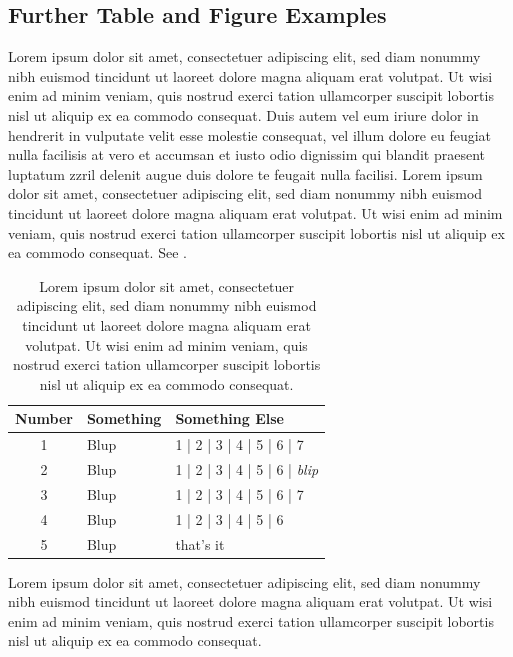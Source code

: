 \subsection{Further Table and Figure Examples}
\label{sec:impr_wd}
Lorem ipsum dolor sit amet, consectetuer adipiscing elit, sed diam nonummy nibh euismod tincidunt ut laoreet dolore magna aliquam erat volutpat. Ut wisi enim ad minim veniam, quis nostrud exerci tation ullamcorper suscipit lobortis nisl ut aliquip ex ea commodo consequat. Duis autem vel eum iriure dolor in hendrerit in vulputate velit esse molestie consequat, vel illum dolore eu feugiat nulla facilisis at vero et accumsan et iusto odio dignissim qui blandit praesent luptatum zzril delenit augue duis dolore te feugait nulla facilisi. Lorem ipsum dolor sit amet, consectetuer adipiscing elit, sed diam nonummy nibh euismod tincidunt ut laoreet dolore magna aliquam erat volutpat. Ut wisi enim ad minim veniam, quis nostrud exerci tation ullamcorper suscipit lobortis nisl ut aliquip ex ea commodo consequat. See .
\begin{table}[!htb]
	\footnotesize
	\centering
		\begin{tabular}{cll}
			\toprule
			Number & Something & Something Else \\
			\midrule
			1 & Blup & 1 | 2 | 3 | 4 | 5 | 6 | 7 \\
			2 & Blup & 1 | 2 | 3 | 4 | 5 | 6 | \emph{blip} \\
			3 & Blup & 1 | 2 | 3 | 4 | 5 | 6 | 7 \\
			4 & Blup & 1 | 2 | 3 | 4 | 5 | 6 \\
			5 & Blup & that's it \\
			\bottomrule
		\end{tabular}
	\normalsize
	\caption[Short caption]{Lorem ipsum dolor sit amet, consectetuer adipiscing elit, sed diam nonummy nibh euismod tincidunt ut laoreet dolore magna aliquam erat volutpat. Ut wisi enim ad minim veniam, quis nostrud exerci tation ullamcorper suscipit lobortis nisl ut aliquip ex ea commodo consequat.}
	\label{tab:imprwdpatterns}
\end{table}

Lorem ipsum dolor sit amet, consectetuer adipiscing elit, sed diam nonummy nibh euismod tincidunt ut laoreet dolore magna aliquam erat volutpat. Ut wisi enim ad minim veniam, quis nostrud exerci tation ullamcorper suscipit lobortis nisl ut aliquip ex ea commodo consequat.


